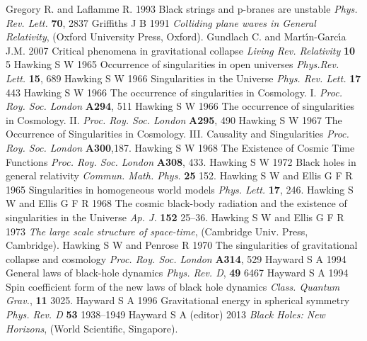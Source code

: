 \documentclass[12pt]{iopart}
\begin{document}
\begin{thebibliography}{999}
 Gregory R. and Laflamme R. 1993 Black strings and p-branes are unstable {\it Phys. Rev. Lett.} {\bf 70}, 2837
 Griffiths J B 1991 {\it Colliding plane waves in General
Relativity\/}, (Oxford University Press, Oxford).
 Gundlach C. and Mart\'{\i}n-Garc\'{\i}a J.M.  2007 Critical phenomena in gravitational collapse {\it Living Rev. Relativity} {\bf  10} 5
 Hawking S W 1965 Occurrence of singularities in open universes {\it Phys.Rev. Lett.} {\bf 15}, 689 
 Hawking S W 1966 Singularities in the Universe {\it Phys. Rev. Lett.} {\bf 17} 443%
 Hawking S W 1966 The occurrence of singularities in Cosmology. I. {\it Proc. Roy. Soc. London} {\bf A294}, 511
 Hawking S W 1966 The occurrence of singularities in Cosmology. II. {\it Proc. Roy. Soc. London} {\bf A295}, 490
 Hawking S W 1967 The Occurrence of Singularities in Cosmology. III. Causality and Singularities {\it Proc. Roy. Soc. London} {\bf A300},187.%
 Hawking S W 1968 The Existence of Cosmic Time Functions {\it Proc. Roy. Soc. London} {\bf A308},
433.%
 Hawking S W 1972 Black holes in general relativity {\it Commun. Math. Phys.} {\bf 25} 152.%
 Hawking S W and Ellis G F R 1965 Singularities in homogeneous world models {\it Phys. Lett.} {\bf 17},
246.%
 Hawking S W and Ellis G F R 1968 The cosmic black-body radiation and the existence of singularities in the Universe {\it Ap. J.} {\bf 152} 25--36.%
 Hawking S W and Ellis G F R 1973 {\it The large scale
structure of space-time\/}, (Cambridge Univ. Press, Cambridge).
 Hawking S W and Penrose R 1970 The singularities of gravitational collapse and cosmology {\it Proc. Roy. Soc. London} {\bf A314}, 529
 Hayward S A 1994 General laws of black-hole dynamics {\it Phys. Rev. D}, {\bf 49} 6467 %
 Hayward S A 1994 Spin coefficient form of the new laws of black hole dynamics {\it Class. Quantum Grav.}, {\bf 11}  3025.%
 Hayward S A 1996 Gravitational energy in spherical symmetry {\it Phys. Rev. D} {\bf 53} 1938--1949
 Hayward S A (editor) 2013 {\it Black Holes: New Horizons}, 
(World Scientific, Singapore).

\end{thebibliography}
\end{document}
